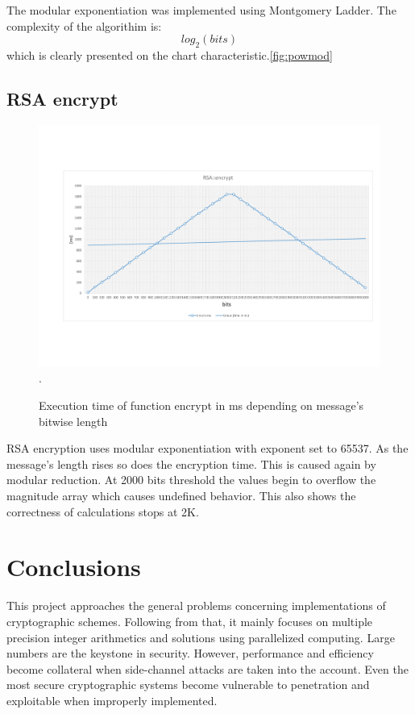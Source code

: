 \documentclass[oneside,openright,12pt,final,en]{mgr}
\begin{document}
The modular exponentiation was implemented using Montgomery Ladder. The complexity of the algorithim is:
\[log_2(bits)\]
which is clearly presented on the chart characteristic.\ref{fig:powmod}


\section{RSA encrypt}

\begin{figure}[H]
	\centering
	\includegraphics[width=\textwidth,trim={0.5cm 2.8cm 0.4cm 2.8cm},clip]{rsa.pdf}.
	\caption{Execution time of function encrypt in ms depending on message's bitwise length}
	\label{fig:rsa}
\end{figure}

RSA encryption uses modular exponentiation with exponent set to 65537. As the message's length rises so does the encryption time. This is caused again by modular reduction. At 2000 bits threshold the values begin to overflow the magnitude array which causes undefined behavior. This also shows the correctness of calculations stops at 2K.

\chapter{Conclusions}


This project approaches the general problems concerning implementations of cryptographic schemes. Following from that, it mainly focuses on multiple precision integer arithmetics and solutions using parallelized computing. Large numbers are the keystone in security. However, performance and efficiency become collateral when side-channel attacks are taken into the account. Even the most secure cryptographic systems become vulnerable to penetration and exploitable when improperly implemented.
\end{document}
